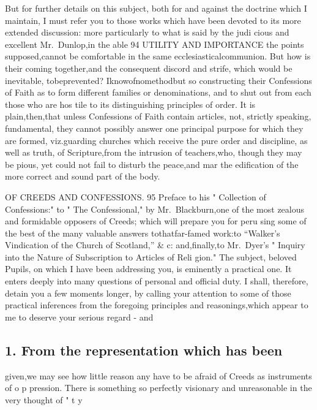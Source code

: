 \documentclass[
]{book}
\begin{document}
But for further details on this subject, both for and against the doctrine which I maintain, I must refer you to those works which have been devoted to its more extended discussion: more particularly to what is said by the judi cious and excellent Mr.~Dunlop,in the able
94 UTILITY AND IMPORTANCE
the points supposed,cannot be comfortable in the same ecclesiasticalcommunion. But how
is their coming together,and the consequent
discord and strife, which would be inevitable, tobeprevented? Iknowofnomethodbut so constructing their Confessions of Faith as to form different families or denominations, and to shut out from each those who are hos
tile to its distinguishing principles of order. It is plain,then,that unless Confessions of Faith contain articles, not, strictly speaking,
fundamental, they cannot possibly answer one principal purpose for which they are formed,
viz.guarding churches which receive the pure order and discipline, as well as truth, of Scripture,from the intrusion of teachers,who, though they may be pious, yet could not fail to disturb the peace,and mar the edification of the more correct and sound part of the body.

OF CREEDS AND CONFESSIONS. 95
Preface to his " Collection of Confessions:" to
" The Confessional," by Mr.~Blackburn,one of the most zealous and formidable opposers
of Creeds; which will prepare you for peru sing some of the best of the many valuable answers tothatfar-famed work:to ``Walker's Vindication of the Church of Scotland,'' \& c: and,finally,to Mr.~Dyer's " Inquiry into the Nature of Subscription to Articles of Reli
gion."
The subject, beloved Pupils, on which I have been addressing you, is eminently a practical one. It enters deeply into many questions of personal and official duty. I shall, therefore, detain you a few moments longer, by calling your attention to some of those practical inferences from the foregoing principles and reasonings,which appear to me to deserve your serious regard - and

\hypertarget{from-the-representation-which-has-been}{%
\subsection{1. From the representation which has been}\label{from-the-representation-which-has-been}}

given,we may see how little reason any have to be afraid of Creeds as instruments of o p
pression.
There is something so perfectly visionary and unreasonable in the very thought of " t y
\end{document}
